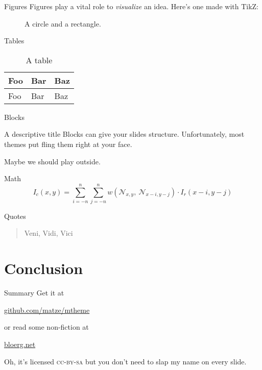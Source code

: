 \documentclass[10pt, compress]{beamer}
\begin{document}
\begin{frame}{Figures}
  Figures play a vital role to \emph{visualize} an idea. Here's one made with
  TikZ:

  \begin{figure}
    \caption{A circle and a rectangle.}
  \end{figure}
\end{frame}

\begin{frame}{Tables}
  \begin{table}
    \caption{A table}
    \begin{tabular}{lll}
      \toprule
      Foo & Bar & Baz\\
      \midrule
      Foo & Bar & Baz\\
      \bottomrule
    \end{tabular}
  \end{table}
\end{frame}

\begin{frame}{Blocks}

  \begin{block}{A descriptive title}
    Blocks can give your slides structure. Unfortunately, most themes put fling
    them right at your face.
  \end{block}

  Maybe we should play outside.

\end{frame}

\begin{frame}{Math}
  \begin{equation*}
    I_c(x,y) = \sum_{i=-n}^n\sum_{j=-n}^n w\left(
      \mathcal{N}_{x,y},\ \mathcal{N}_{x-i, y-j}\right)
      \cdot
      I_r(x-i,y-j)
  \end{equation*}
\end{frame}

\begin{frame}{Quotes}
  \begin{quote}
    Veni, Vidi, Vici
  \end{quote}
\end{frame}

\section{Conclusion}

\begin{frame}{Summary}
  Get it at

  \begin{center}\url{github.com/matze/mtheme}\end{center}

  or read some non-fiction at

  \begin{center}\url{bloerg.net}\end{center}

  Oh, it's licensed \textsc{cc-by-sa} but you don't need to slap my name on every slide.
\end{frame}

\end{document}
